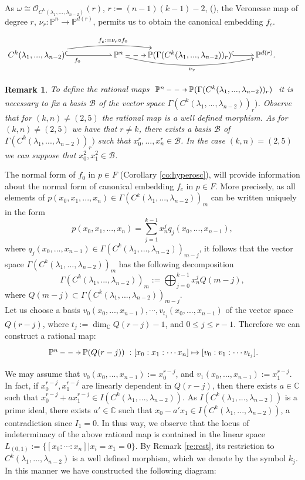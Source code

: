 \documentclass{amsart}
\newcommand{\C}[3]{\ensuremath{C^{#1}(#3_1,...,#3_{#2})}}
\newtheorem{remark}[theorem]{Remark}
\begin{document}
As $\omega\cong \mathcal{O}_{\C{k}{n-2}{\lambda}}(r)$, $r:=(n-1)(k-1)-2$, (\cite[page 188]{Har77}), the Veronesse map of degree $r$,
$\nu_r:{\mathbb{P}}^n\rightarrow {\mathbb{P}}^{d(r)}$, permits us to obtain the canonical embedding  $f_c$. 
  
\begin{center}
$\xymatrix{\C{k}{n-2}{\lambda} \ar@^{(->}[rr]_{f_0} \ar@/^1pc/[rrr]^{f_c:=\nu_r\circ f_0}&
& {\mathbb{P}}^{n}\ar@{-->}[r] \ar@/_1pc/[rr]_{\nu_r} &{\mathbb{P}}(\Gamma(\C{k}{n-2}{\lambda})_r) \ar@^{(->}[r]& {\mathbb{P}}^{d(r)}. }$
\end{center}
 
\begin{remark}
To define the rational maps 
$\xymatrix{{\mathbb{P}}^{n}\ar@{-->}[r]  &{\mathbb{P}}(\Gamma(\C{k}{n-2}{\lambda})_r)}$
it is necessary to fix a basis $\mathcal{B}$ of the vector space $\Gamma(\C{k}{n-2}{\lambda})_r)$.  Observe that for $(k,n)\neq(2,5)$ the rational map is a well defined morphism. 
As for $(k,n)\neq(2,5)$ we have that $r\neq k$, there exists a basis $\mathcal{B}$ of  $\Gamma(\C{k}{n-2}{\lambda})_r)$ such that $x_0^r,...,x_n^r\in \mathcal{B}$.  In the case $(k,n)=(2,5)$ we can suppose that $x_0^2, x_1^2 \in \mathcal{B}$.
\end{remark}

The normal form of $f_0$ in $p\in F$ (Corollary \ref{co:hyperosc}), will provide information about the normal form
 of canonical embedding $f_c$ in $p\in F$. More precisely, as 
 all elements of $p(x_0,x_1,...,x_n)\in \Gamma(\C{k}{n-2}{\lambda})_m$ 
 can be written uniquely in the form
 $$p(x_0,x_1,...,x_n)=\sum_{j=1}^{k-1}x_n^{j}q_j(x_0,...,x_{n-1}),$$
 where $q_j(x_0,...,x_{n-1})\in  \Gamma(\C{k}{n-2}{\lambda})_{m-j}$,
 it follows that the vector space 
 $\Gamma(\C{k}{n-2}{\lambda} )_m$ 
  has the following decomposition
 $$\displaystyle \Gamma(\C{k}{n-2}{\lambda})_m:=\bigoplus_{j=0}^{k-1} x_n^{j}Q(m-j),$$
 where $Q(m-j)\subset \Gamma(\C{k}{n-2}{\lambda})_{m-j}$.\\
 

Let us choose a basis $v_0(x_0,...,x_{n-1}),\cdots,v_{t_j}(x_0,...,x_{n-1})$  of the vector space  $Q(r-j)$, where $t_j:=\dim_{\mathbb{C}}Q(r-j)-1$, and $0\leq j\leq r-1$. Therefore we can construct a rational map:
$$\xymatrix{{\mathbb{P}}^{n}\ar@{-->}[r] &{\mathbb{P}}(Q(r-j))}:[x_0:x_1:\cdots x_n]\mapsto [v_0:v_1:\cdots v_{t_j}].$$
	
We  may assume that $v_0(x_0,...,x_{n-1}):=x_0^{r-j}$, and $v_1(x_0,...,x_{n-1}):=x_1^{r-j}$. 
 In fact, if $x_0^{r-j}, x_1^{r-j}$  are linearly dependent in $Q(r-j)$, 
then there exists $a\in \mathbb{C}$ such that $x_0^{r-j}+ax_1^{r-j}\in I(\C{k}{n-2}{\lambda})$. 
 As  $I(\C{k}{n-2}{\lambda})$ is a prime ideal,  there exists  $a'\in \mathbb{C}$ such that $x_0-a'x_1\in I(\C{k}{n-2}{\lambda})$,
  a contradiction since $I_1=0$. 
 In thus way, we observe that  the locus of indeterminacy of the  above rational map  is contained in the linear space $L_{(0,1)}:=\{[x_0:\cdots:x_n]|x_i=x_1=0\}$. 
   By Remark  \ref{re:rest}, its restriction to $\C{k}{n-2}{\lambda}$ 
is a well defined morphism, which we denote by the symbol $k_j$.
In this manner we have constructed the following diagram:	
\end{document}
